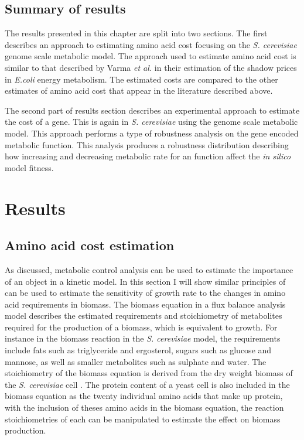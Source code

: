\subsection{Summary of results}

The results presented in this chapter are split into two sections. The first describes an approach to estimating amino acid cost focusing on the \emph{S. cerevisiae} genome scale metabolic model. The approach used to estimate amino acid cost is similar to that described by Varma \emph{et al.} in their estimation of the shadow prices in \emph{E.coli} energy metabolism. The estimated costs are compared to the other estimates of amino acid cost that appear in the literature described above.

The second part of results section describes an experimental approach to estimate the cost of a gene. This is again in \emph{S. cerevisiae} using the genome scale metabolic model. This approach performs a type of robustness analysis on the gene encoded metabolic function. This analysis produces a robustness distribution describing how increasing and decreasing metabolic rate for an function affect the \emph{in silico} model fitness.

\clearpage

\section{Results}

\subsection{Amino acid cost estimation}\label{section:amino_acid_cost_estimation}

As discussed, metabolic control analysis can be used to estimate the importance of an object in a kinetic model. In this section I will show similar principles of can be used to estimate the sensitivity of growth rate to the changes in amino acid requirements in biomass. The biomass equation in a flux balance analysis model describes the estimated requirements and stoichiometry of metabolites required for the production of a biomass, which is equivalent to growth. For instance in the biomass reaction in the \emph{S. cerevisiae} model, the requirements include fats such as triglyceride and ergosterol, sugars such as glucose and mannose, as well as smaller metabolites such as sulphate and water. The stoichiometry of the biomass equation is derived from the dry weight biomass of the \emph{S. cerevisiae} cell \cite{duarte2004a}. The protein content of a yeast cell is also included in the biomass equation as the twenty individual amino acids that make up protein, with the inclusion of theses amino acids in the biomass equation, the reaction stoichiometries of each can be manipulated to estimate the effect on biomass production.

